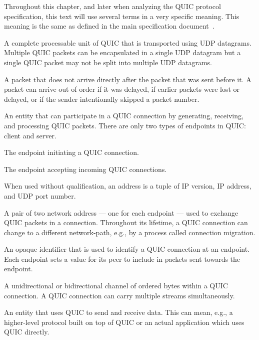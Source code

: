 Throughout this chapter, and later when analyzing the QUIC protocol specification, this text will
use several terms in a very specific meaning. This meaning is the same as defined in the main
specification document~\autocite[Section~1.2]{draft-ietf-quic-transport}.

\begin{description}

   A complete processable unit of QUIC that is transported using UDP
datagrams. Multiple QUIC packets can be encapsulated in a single UDP datagram but a single QUIC
packet may not be split into multiple UDP datagrams.

   A packet that does not arrive directly after the packet that was
sent before it. A packet can arrive out of order if it was delayed, if earlier packets were lost or
delayed, or if the sender intentionally skipped a packet number.

   An entity that can participate in a QUIC connection by generating, receiving, and
processing QUIC packets. There are only two types of endpoints in QUIC\@: client and server.

   The endpoint initiating a QUIC connection.

   The endpoint accepting incoming QUIC connections.

   When used without qualification, an address is a tuple of IP version, IP address,
and UDP port number.

   A pair of two network address --- one for each endpoint --- used to
exchange QUIC packets in a connection. Throughout its lifetime, a QUIC connection can change to a
different network-path, e.g., by a process called connection migration.

   An opaque identifier that is used to identify a QUIC connection at an endpoint.
Each endpoint sets a value for its peer to include in packets sent towards the endpoint.

   A unidirectional or bidirectional channel of ordered bytes within a QUIC
connection. A QUIC connection can carry multiple streams simultaneously.

   An entity that uses QUIC to send and receive data. This can mean, e.g., a
higher-level protocol built on top of QUIC or an actual application which uses QUIC directly.

\end{description}

